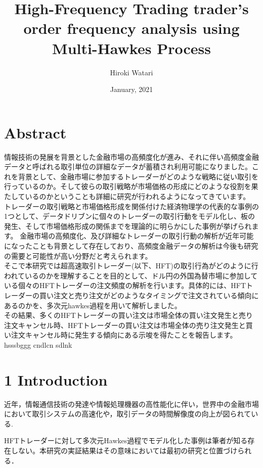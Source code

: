 \documentclass[a4paper,11pt,oneside,openany]{book}
\title{High-Frequency Trading trader's order frequency analysis using Multi-Hawkes Process}
\author{Hiroki Watari}
\affiliation{%
  Graduate Major in Artificial Intelligence\\
  School of Computing\\
  Tokyo Institute of Technology}
\date{January, 2021}
\begin{document}
\frontmatter
\maketitle
\chapter{Abstract}
情報技術の発展を背景とした金融市場の高頻度化が進み、それに伴い高頻度金融データと呼ばれる取引単位の詳細なデータが蓄積され利用可能になりました。これを背景として、金融市場に参加するトレーダーがどのような戦略に従い取引を行っているのか。そして彼らの取引戦略が市場価格の形成にどのような役割を果たしているのかということも詳細に研究が行われるようになってきています。\\
トレーダーの取引戦略と市場価格形成を関係付けた経済物理学の代表的な事例の1つとして、データドリブンに個々のトレーダーの取引行動をモデル化し、板の発生、そして市場価格形成の関係までを理論的に明らかにした事例が挙げられます。 金融市場の高頻度化、及び詳細なトレーダーの取引行動の解析が近年可能になったことも背景として存在しており、高頻度金融データの解析は今後も研究の需要と可能性が高い分野だと考えられます。\\
そこで本研究では超高速取引トレーダー(以下、HFT)の取引行為がどのように行われているのかを理解することを目的として、ドル円の外国為替市場に参加している個々のHFTトレーダーの注文頻度の解析を行います。具体的には、HFTトレーダーの買い注文と売り注文がどのようなタイミングで注文されている傾向にあるのかを、多次元hawkes過程を用いて解析しました。\\
その結果、多くのHFTトレーダーの買い注文は市場全体の買い注文発生と売り注文キャンセル時、HFTトレーダーの買い注文は市場全体の売り注文発生と買い注文キャンセル時に発生する傾向にある示唆を得たことを報告します。
hsssbggg
cndlcn
sdlnk

\tableofcontents

\chapter{1 Introduction}
近年，情報通信技術の発達や情報処理機器の高性能化に伴い，世界中の金融市場において取引システムの高速化や，取引データの時間解像度の向上が図られている.

HFTトレーダーに対して多次元Hawkes過程でモデル化した事例は筆者が知る存在しない。本研究の実証結果はその意味においては最初の研究と位置づけられる．
\end{document}
